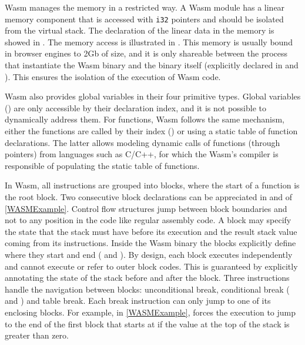 Wasm  manages the memory in a restricted way. A Wasm  module has a linear memory component that is accessed with \texttt{i32} pointers and should be isolated from the virtual stack. The declaration of the linear data in the memory is showed in . The memory access is illustrated in . This memory is usually bound in browser engines to 2Gb of size, and it is only shareable between the process that instantiate the Wasm  binary and the binary itself (explicitly declared in  and ). This ensures the isolation of the execution of Wasm  code. 

Wasm  also provides global variables in their four primitive types. Global variables () are only accessible by their declaration index, and it is not possible to dynamically address them. For functions, Wasm  follows the same mechanism, either the functions are called by their index () or using a static table of function declarations. The latter allows modeling dynamic calls of functions (through pointers) from languages such as C/C++, for which the Wasm's compiler is responsible of populating the static table of functions.


In Wasm, all instructions are grouped into blocks, where the start of a function is the root block. Two consecutive block declarations can be appreciated in  and  of \autoref{WASMExample}. Control flow structures jump between block boundaries and not to any position in the code like regular assembly code. A block may specify the state that the stack must have before its execution and the result stack value coming from its instructions. Inside the Wasm  binary the blocks explicitly define where they start and end ( and ). By design, each block executes independently and cannot execute or refer to outer block codes. This is guaranteed by explicitly annotating the state of the stack before and after the block. Three instructions handle the navigation between blocks: unconditional break, conditional break ( and ) and table break. Each break instruction can only jump to one of its enclosing blocks. For example, in \autoref{WASMExample},  forces the execution to jump to the end of the first block that starts at  if the value at the top of the stack is greater than zero.


